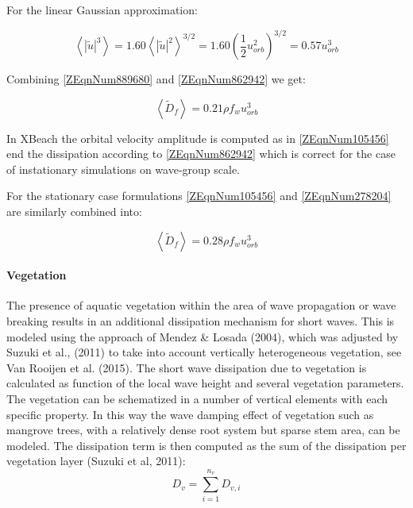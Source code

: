 \documentclass{article}
\begin{document}
\noindent For the linear Gaussian approximation:

\noindent 
\begin{equation} \label{ZEqnNum278204} 
\left\langle \left|\tilde{u}\right|^{3} \right\rangle =1.60\left\langle \left|\tilde{u}\right|^{2} \right\rangle ^{3/2} =1.60\left(\frac{1}{2} u_{orb}^{2} \right)^{3/2} =0.57u_{orb}^{3}  
\end{equation} 


\noindent Combining \eqref{ZEqnNum889680} and \eqref{ZEqnNum862942} we get:

\noindent 
\begin{equation} \label{2.22)} 
\left\langle \tilde{D}_{f} \right\rangle =0.21\rho f_{w} u_{orb}^{3}  
\end{equation} 


\noindent In XBeach the orbital velocity amplitude is computed as in \eqref{ZEqnNum105456} end the dissipation according to \eqref{ZEqnNum862942} which is correct for the case of instationary simulations on wave-group scale. 

\noindent 

\noindent For the stationary case formulations \eqref{ZEqnNum105456} and \eqref{ZEqnNum278204} are similarly combined into: 

\noindent 
\begin{equation} \label{ZEqnNum720951} 
\left\langle \tilde{D}_{f} \right\rangle =0.28\rho f_{w} u_{orb}^{3}  
\end{equation} 


\paragraph{ Vegetation}

\noindent The presence of aquatic vegetation within the area of wave propagation or wave breaking results in an additional dissipation mechanism for short waves. This is modeled using the approach of Mendez \& Losada (2004), which was adjusted by Suzuki et al., (2011) to take into account vertically heterogeneous vegetation, see Van Rooijen et al. (2015). The short wave dissipation due to vegetation is calculated as function of the local wave height and several vegetation parameters. The vegetation can be schematized in a number of vertical elements with each specific property. In this way the wave damping effect of vegetation such as mangrove trees, with a relatively dense root system but sparse stem area, can be modeled. The dissipation term is then computed as the sum of the dissipation per vegetation layer (Suzuki et al, 2011):
\begin{equation} \label{2.24)} 
D_{v} =\sum _{i=1}^{n_{v} }D_{v,i}   
\end{equation} 
\end{document}
